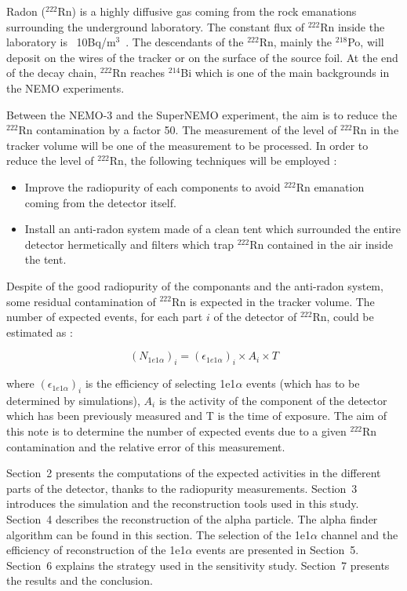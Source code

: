 \documentclass[main.tex]{subfiles}
\begin{document}
\bigskip

\noindent Radon ($^{222}$Rn) is a highly diffusive gas coming from the rock emanations surrounding the underground laboratory. The constant flux of $^{222}$Rn inside the laboratory is ~10Bq/m$^3$~\cite{radon_at_LSM}. The descendants of the $^{222}$Rn, mainly the $^{218}$Po, will deposit on the wires of the tracker or on the surface of the source foil. At the end of the decay chain, $^{222}$Rn reaches $^{214}$Bi which is one of the main backgrounds in the NEMO experiments.

\bigskip

\noindent Between the NEMO-3 and the SuperNEMO experiment, the aim is to reduce the $^{222}$Rn contamination by a factor 50. The measurement of the level of $^{222}$Rn in the tracker volume will be one of the measurement to be processed. In order to reduce the level of $^{222}$Rn, the following techniques will be employed :
\begin{itemize}
\item Improve the radiopurity of each components to avoid $^{222}$Rn emanation coming from the detector itself.
\item Install an anti-radon system made of a clean tent which surrounded the entire detector hermetically and filters which trap $^{222}$Rn contained in the air inside the tent. 
\end{itemize}


\noindent Despite of the good radiopurity of the componants and the anti-radon system, some residual contamination of $^{222}$Rn is expected in the tracker volume. The number of expected events, for each part $i$ of the detector of $^{222}$Rn, could be estimated as :

\begin{equation}
(N_{1e1\alpha})_i = (\epsilon_{1e1\alpha})_i \times A_i \times T
\label{eq_number_of_expected_events}
\end{equation}

\noindent where $(\epsilon_{1e1\alpha})_i$ is the efficiency of selecting 1e1$\alpha$ events (which has to be determined by simulations), $A_i$ is the activity of the component of the detector which has been previously measured and T is the time of exposure. The aim of this note is to determine the number of expected events due to a given $^{222}$Rn contamination and the relative error of this measurement.

\bigskip

\noindent Section~2 presents the computations of the expected activities in the different parts of the detector, thanks to the radiopurity measurements. Section~3 introduces the simulation and the reconstruction tools used in this study. Section~4 describes the reconstruction of the alpha particle. The alpha finder algorithm can be found in this section. The selection of the 1e1$\alpha$ channel and the efficiency of reconstruction of the 1e1$\alpha$ events are presented in Section~5. Section~6 explains the strategy used in the sensitivity study. Section~7 presents the results and the conclusion. 
\end{document}
